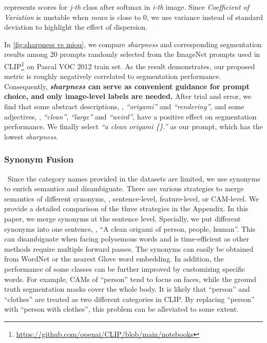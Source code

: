 \documentclass[10pt,twocolumn,letterpaper]{article}
\begin{document}
 represents scores for \textit{j-th} class after softmax in \textit{i-th} image. Since \textit{Coefficient of Variation} is unstable when \textit{mean} is close to 0, we use variance instead of standard deviation to highlight the effect of dispersion. 

In \cref{fig:sharpness vs miou}, we compare \textit{sharpness} and corresponding segmentation results among 20 prompts randomly selected from the ImageNet prompts used in CLIP\footnote{\href{https://github.com/openai/CLIP/blob/main/notebooks/Prompt_Engineering_for_ImageNet.ipynb}{https://github.com/openai/CLIP/blob/main/notebooks}} on Pascal VOC 2012 train set. As the result demonstrates, our proposed metric is roughly negatively correlated to segmentation performance. 
Consequently, \textbf{\textit{sharpness} can serve as convenient guidance for prompt choice, and only image-level labels are needed.} After trial and error, we find that some abstract descriptions, \eg, \textit{``origami''} and \textit{``rendering''}, and some adjectives, \eg, \textit{``clean''}, \textit{``large''} and \textit{``weird''}, have a positive effect on segmentation performance. We finally select \textit{``a clean origami \{\}.''} as our prompt, which has the lowest \textit{sharpness}. 
\vspace{-2mm}
\subsubsection{Synonym Fusion} 
\ 
\indent Since the category names provided in the datasets are limited, we use synonyms to enrich semantics and disambiguate. There are various strategies to merge semantics of different synonyms, \eg, sentence-level, feature-level, or CAM-level. We provide a detailed comparison of the three strategies in the Appendix. In this paper, we merge synonyms at the sentence level. Specially, we put different synonyms into one sentence, \eg, ``A clean origami of person, people, human''. This can disambiguate when facing polysemous words and is time-efficient as other methods require multiple forward passes. The synonyms can easily be obtained from WordNet or the nearest Glove word embedding. In addition, the performance of some classes can be further improved by customizing specific words. For example, CAMs of ``person'' tend to focus on faces, while the ground truth segmentation masks cover the whole body. It is likely that ``person'' and ``clothes'' are treated as two different categories in CLIP. By replacing ``person'' with ``person with clothes'', this problem can be alleviated to some extent. 
\end{document}
